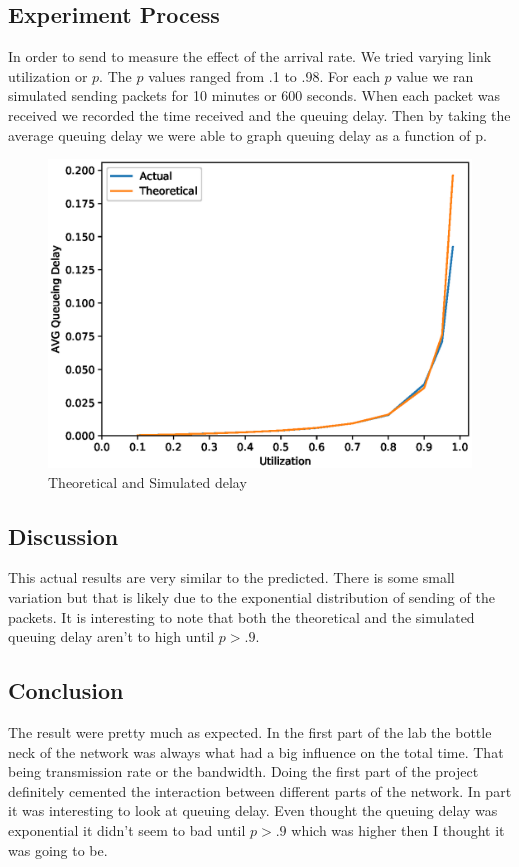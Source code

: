 \documentclass{article}
\begin{document}
\subsection{Experiment Process}
In order to send to measure the effect of the arrival rate.
We tried varying link utilization or ${p}$.
The ${p}$ values ranged from .1 to .98.
For each ${p}$ value we ran simulated sending packets for 10 minutes or 600 seconds.
When each packet was received we recorded the time received and the queuing delay.
Then by taking the average queuing delay we were able to graph queuing delay as a function of p.
\begin{figure}[htp]
    \centering
    \includegraphics[width=\textwidth]{delay.eps}
    \caption{Theoretical and Simulated delay}
    \label{fig:graph}
\end{figure}
\subsection{Discussion}
This actual results are very similar to the predicted.
There is some small variation but that is likely due to the exponential distribution of sending of the packets.
It is interesting to note that both the theoretical and the simulated queuing delay aren't to high until ${p > .9}$.
\subsection{Conclusion}
The result were pretty much as expected.
In the first part of the lab the bottle neck of the network was always what had a big influence on the total time.
That being transmission rate or the bandwidth.
Doing the first part of the project definitely cemented the interaction between different parts of the network.
In part it was interesting to look at queuing delay.
Even thought the queuing delay was exponential it didn't seem to bad until $p>.9$ which was higher then I thought it was going to be.
\end{document}
